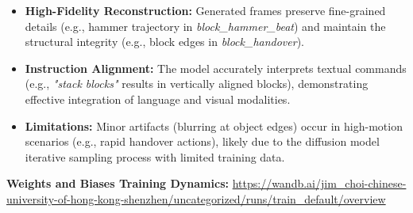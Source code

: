 \begin{itemize}
    \item \textbf{High-Fidelity Reconstruction:} 
    Generated frames preserve fine-grained details (e.g., hammer trajectory in \textit{block\_hammer\_beat}) 
        and maintain the structural integrity (e.g., block edges in \textit{block\_handover}).
    \item \textbf{Instruction Alignment:} 
    The model accurately interprets textual commands (e.g., \textit{"stack blocks"} results in vertically aligned blocks),
        demonstrating effective integration of language and visual modalities.
    \item \textbf{Limitations:} 
    Minor artifacts (blurring at object edges) occur in high-motion scenarios (e.g., rapid handover actions), 
        likely due to the diffusion model iterative sampling process with limited training data.
\end{itemize}

\noindent
\textbf{Weights and Biases Training Dynamics:}
\url{https://wandb.ai/jim_choi-chinese-university-of-hong-kong-shenzhen/uncategorized/runs/train_default/overview}

